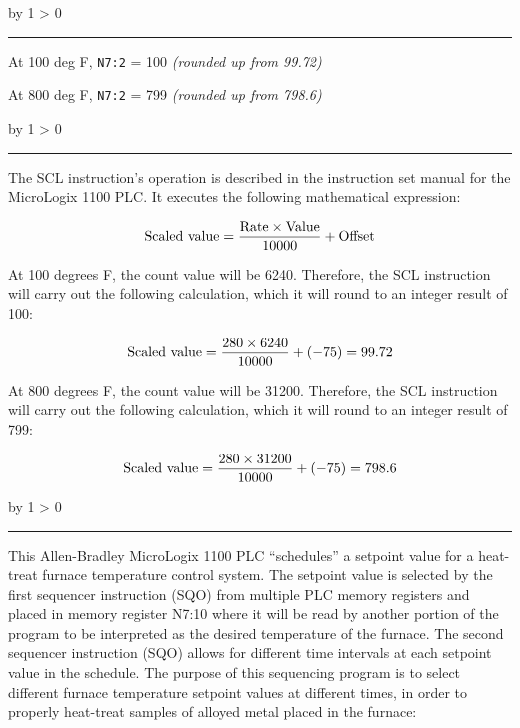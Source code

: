 \documentclass[12pt,a4paper]{article}
\def\oppgave{
            \advance\questnum by 1
            \ifnum \questnum > 0
                 \hrule
                 \vskip 3pt
                 \leftline{Oppgave \the\questnum}
                 \vskip 3pt \fi}
\def\svar{
           \advance\answnum by 1
           \ifnum \answnum > 0
                \hrule
                \vskip 3pt
                \leftline{Svar \the\answnum}
                \vskip 3pt \fi}
\def\notes{
           \advance\explnum by 1
           \ifnum \explnum > 0
                \hrule
                \vskip 3pt
                \leftline{Notes \the\explnum}
                \vskip 3pt \fi}
\begin{document}
\vskip 10pt \filbreak 





\svar{} 

At 100 deg F, {\tt N7:2} = 100 {\it (rounded up from 99.72)}

\vskip 10pt

At 800 deg F, {\tt N7:2} = 799 {\it (rounded up from 798.6)}

\vskip 10pt \filbreak 





\notes{} 

The SCL instruction's operation is described in the instruction set manual for the MicroLogix 1100 PLC.  It executes the following mathematical expression:

$$\hbox{Scaled value} = {\hbox{Rate} \times \hbox{Value} \over 10000} + \hbox{Offset}$$

\vskip 10pt

At 100 degrees F, the count value will be 6240.  Therefore, the SCL instruction will carry out the following calculation, which it will round to an integer result of 100:

$$\hbox{Scaled value} = {280 \times 6240 \over 10000} + (-75) = 99.72$$

\vskip 10pt

At 800 degrees F, the count value will be 31200.  Therefore, the SCL instruction will carry out the following calculation, which it will round to an integer result of 799:

$$\hbox{Scaled value} = {280 \times 31200 \over 10000} + (-75) = 798.6$$



\vfil \eject 



\oppgave{} 

This Allen-Bradley MicroLogix 1100 PLC ``schedules'' a setpoint value for a heat-treat furnace temperature control system.  The setpoint value is selected by the first sequencer instruction (SQO) from multiple PLC memory registers and placed in memory register N7:10 where it will be read by another portion of the program to be interpreted as the desired temperature of the furnace.  The second sequencer instruction (SQO) allows for different time intervals at each setpoint value in the schedule.  The purpose of this sequencing program is to select different furnace temperature setpoint values at different times, in order to properly heat-treat samples of alloyed metal placed in the furnace:
\end{document}
